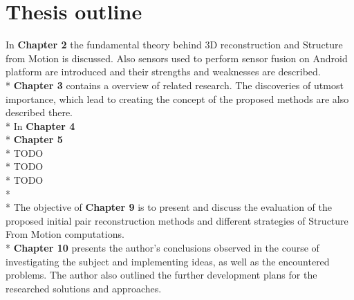 \section{Thesis outline}
In \textbf{Chapter 2} the fundamental theory behind 3D reconstruction and Structure from Motion is discussed. Also sensors used to perform sensor fusion on Android platform are introduced and their strengths and weaknesses are described.
\\*
\textbf{Chapter 3} contains a overview of related research. The discoveries of utmost importance, which lead to creating the concept of the proposed methods are also described there. 
\\*
In \textbf{Chapter 4}
\\*
\textbf{Chapter 5}
\\*
TODO
\\*
TODO
\\*
TODO
\\*
\\*
The objective of \textbf{Chapter 9} is to present and discuss the evaluation of the proposed initial pair reconstruction methods and different strategies of Structure From Motion computations.
\\*
\textbf{Chapter 10} presents the author's conclusions observed in the course of investigating the subject and implementing ideas, as well as the encountered problems. The author also outlined the further development plans for the researched solutions and approaches.




